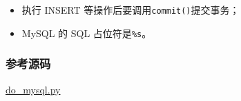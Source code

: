 \begin{itemize}
\item
  执行 INSERT 等操作后要调用\texttt{commit()}提交事务；
\item
  MySQL 的 SQL 占位符是\texttt{\%s}。
\end{itemize}

\hypertarget{ux53c2ux8003ux6e90ux7801}{%
\subsubsection{参考源码}\label{ux53c2ux8003ux6e90ux7801}}

\href{https://github.com/michaelliao/learn-python3/blob/master/samples/db/do_mysql.py}{do\_mysql.py}

